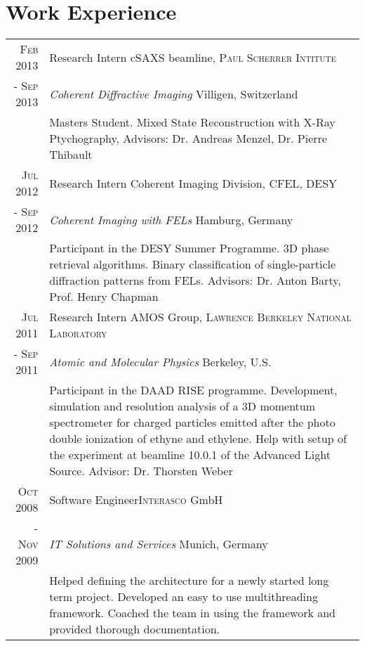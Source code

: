 \documentclass[a4paper,10pt]{article}
\begin{document}
\section{Work Experience}
\begin{tabularx}{19cm}{rX}

 \textsc{Feb 2013} & Research Intern \hfill cSAXS beamline, \textsc{Paul Scherrer Intitute}\\
\textsc{- Sep 2013} &\emph{Coherent Diffractive Imaging} \hfill Villigen, Switzerland\\
&\footnotesize{Masters Student. Mixed State Reconstruction with X-Ray Ptychography, Advisors: Dr. Andreas Menzel, Dr. Pierre Thibault}\vspace{2mm}\\ 

 \textsc{Jul 2012} & Research Intern \hfill Coherent Imaging Division, \textsc{CFEL, DESY}\\
\textsc{- Sep 2012} &\emph{Coherent Imaging with FELs} \hfill Hamburg, Germany\\
&\footnotesize{Participant in the DESY Summer Programme. 3D phase retrieval algorithms. Binary classification of single-particle diffraction patterns from FELs. Advisors: Dr. Anton Barty, Prof. Henry Chapman}\vspace{2mm}\\ 

 \textsc{Jul 2011} & Research Intern \hfill AMOS Group, \textsc{Lawrence Berkeley National Laboratory}\\
\textsc{- Sep 2011} &\emph{Atomic and Molecular Physics} \hfill Berkeley, U.S.\\
&\footnotesize{Participant in the DAAD RISE programme. Development, simulation and resolution analysis of a 3D momentum spectrometer for charged particles emitted
after the photo double ionization of ethyne and ethylene. Help with setup of the experiment at beamline 10.0.1 of
the Advanced Light Source. Advisor: Dr. Thorsten Weber}\vspace{2mm}\\ 

 \textsc{Oct 2008} & Software Engineer\hfill \textsc{Interasco} GmbH
 \\\textsc{- Nov 2009}&\emph{IT Solutions and Services} \hfill Munich, Germany\\&\footnotesize{Helped defining the architecture for a newly started long term project. Developed an easy to use multithreading framework. Coached the team in using the framework and provided thorough documentation.}\vspace{2mm}\\ 


\end{tabularx}
\end{document}
